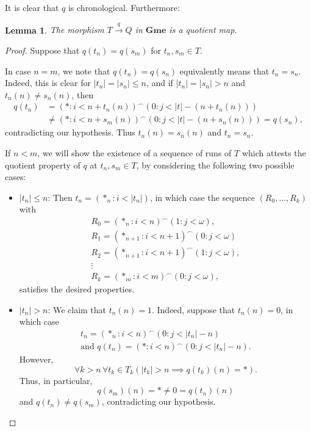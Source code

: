 \documentclass[12pt]{amsart}
\newtheorem{lemma}[thm]{Lemma}
\theoremstyle{definition}
\newcommand{\seq}[1]{{\left( {#1} \right)}}
\newcommand{\Gmes}{\mathbf{Gme}}
\begin{document}
It is clear that $q$ is chronological. Furthermore:

\begin{lemma}\label{LEMMA_q_regular}
	The morphism $T\stackrel{q}{\to}Q$ in $\Gmes$ is a quotient map.
\end{lemma}
\begin{proof}
	Suppose that $q(t_n)=q(s_m)$ for $t_n,s_m\in T$. 
	
	In case $n=m$, we note that $q(t_n)=q(s_n)$ equivalently means that $t_n=s_n$. Indeed, this is clear for $|t_n|=|s_n| \le n$, and if $|t_n|=|s_n| > n$ and $t_n(n) \neq s_n(n)$, then
	\begin{align*}
		q(t_n) &= \seq{\ast: i<n+t_n(n)}^\smallfrown\seq{0: j<|t|-(n+t_n(n))} \\
		&\neq \seq{\ast: i<n+s_m(n)}^\smallfrown\seq{0: j<|t|-(n+s_n(n))} = q(s_n),
	\end{align*}
	contradicting our hypothesis. Thus $t_n(n) = s_n(n)$ and $t_n = s_n$.
	
	If $n<m$, we will show the existence of a sequence of runs of $T$ which attests the quotient property of $q$ at $t_n,s_m\in T$, by considering the following two possible cases:
	\begin{itemize}
		\item $|t_n|\le n$: Then $t_n = \seq{\ast_n: i<|t_n|}$, in which case the sequence $\seq{R_0, \dotsc, R_k}$ with 
		\begin{gather*}
			R_0 = \seq{\ast_n: i<n}^\smallfrown\seq{1:j<\omega},\\
			R_1 = \seq{\ast_{n+1}: i<n+1}^\smallfrown\seq{0:j<\omega}\\
			R_2 = \seq{\ast_{n+1}: i<n+1}^\smallfrown\seq{1:j<\omega},\\
			\vdots\\
			R_k = \seq{\ast_{m}: i<m}^\smallfrown\seq{0:j<\omega},
		\end{gather*}
		satisfies the desired properties.
		
		\item $|t_n|> n$: We claim that $t_n(n) =  1$. Indeed, suppose that $t_n(n) = 0$, in which case 
		\begin{gather*}
			t_n = \seq{\ast_n: i<n}^\smallfrown \seq{0:j<|t_n|-n}\\
			\text{and } q(t_n) = \seq{\ast: i<n}^\smallfrown \seq{0:j<|t_n|-n}.
		\end{gather*}
		However, 
		\begin{equation}\label{EQ_Gme_Strong_not_Reg}
			\forall k>n \, \forall t_k\in T_k \left(|t_k|>n\implies q(t_k)(n)=\ast \right).
		\end{equation}
		Thus, in particular,
		\[
		q(s_m)(n)=\ast\neq 0 = q(t_n)(n)
		\] 
		and $q(t_n)\neq q(s_m)$, contradicting our hypothesis. 
		

\end{itemize}
\end{proof}
\end{document}
